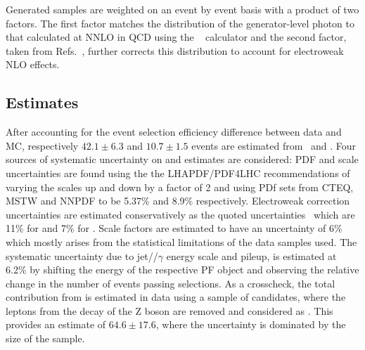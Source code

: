 Generated samples are weighted on an event by event basis with a product of two factors. 
The first factor matches the distribution of the generator-level photon
 \pt to that calculated at NNLO in QCD using the 
 \DYRes~\cite{Catani:2015vma} calculator and
 the second factor, taken from
 Refs.~\cite{Denner:2014bna,Denner:2015fca}, further corrects this distribution
 to account for electroweak NLO effects. 


 \subsection{\vg Estimates}
After accounting for the event selection efficiency difference between data and MC,
 respectively $42.1 \pm 6.3$ and $10.7 \pm 1.5$ events are estimated
 from \zgnng\ and \wglng. 
Four sources of systematic uncertainty on \zg and \wg estimates are considered:
PDF and scale uncertainties are
 found using the the LHAPDF/PDF4LHC recommendations
 of varying the scales up and down by a factor of 2 
 and using PDf sets from CTEQ, MSTW and NNPDF 
 to be 5.37\% and 8.9\% respectively.
Electroweak correction uncertainties
 are estimated conservatively as the quoted
 uncertainties~\cite{Denner:2014bna,Denner:2015fca}
 which are 11\% for \zg and 7\% for \wg.
Scale factors are estimated to have an uncertainty of 6\%
 which mostly  arises from the statistical limitations of the data samples
 used.
The systematic uncertainty due to jet/\met/$\gamma$
 energy scale and pileup, is estimated at 6.2\%
 by shifting the energy of the respective PF object
 and observing the relative change in the number
 of events passing selections.  
As a crosscheck, the total contribution from \zgnng is estimated
 in data using a sample of \zgllg candidates,
 where the leptons from the decay of the Z boson are removed and considered as
 \met. 
This provides an estimate of $64.6 \pm 17.6$, 
 where the uncertainty is dominated by the size of the sample.

